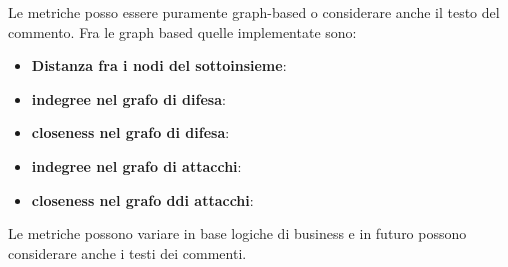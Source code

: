 Le metriche posso essere puramente graph-based o considerare anche il testo del commento. Fra le graph based quelle implementate sono:

\begin{itemize}
    \item \textbf{Distanza fra i nodi del sottoinsieme}:

    \item \textbf{indegree nel grafo di difesa}:

    \item \textbf{closeness nel grafo di difesa}:

    \item \textbf{indegree nel grafo di attacchi}:

    \item \textbf{closeness nel grafo ddi attacchi}:
\end{itemize}


Le metriche possono variare in base logiche di business e in futuro possono considerare anche i testi dei commenti.



